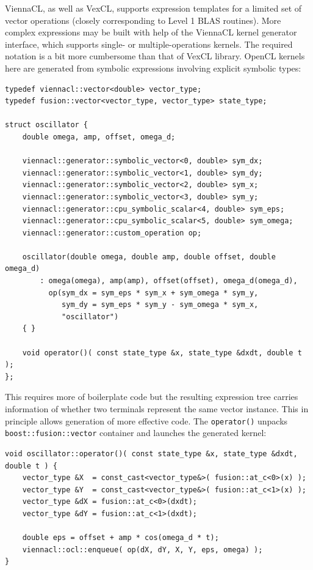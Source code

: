 \documentclass[1p]{elsarticle}
\newcommand{\code}[1]{\lstinline|#1|}
\begin{document}
ViennaCL, as well as VexCL, supports expression templates for a limited set of
vector operations (closely corresponding to Level 1 BLAS routines). More
complex expressions may be built with help of the ViennaCL kernel generator
interface, which supports single- or multiple-operations kernels. The required
notation is a bit more cumbersome than that of VexCL library. OpenCL kernels
here are generated from symbolic expressions involving explicit symbolic types:
\begin{lstlisting}
typedef viennacl::vector<double> vector_type;
typedef fusion::vector<vector_type, vector_type> state_type;

struct oscillator {
    double omega, amp, offset, omega_d;

    viennacl::generator::symbolic_vector<0, double> sym_dx;
    viennacl::generator::symbolic_vector<1, double> sym_dy;
    viennacl::generator::symbolic_vector<2, double> sym_x;
    viennacl::generator::symbolic_vector<3, double> sym_y;
    viennacl::generator::cpu_symbolic_scalar<4, double> sym_eps;
    viennacl::generator::cpu_symbolic_scalar<5, double> sym_omega;
    viennacl::generator::custom_operation op;

    oscillator(double omega, double amp, double offset, double omega_d)
        : omega(omega), amp(amp), offset(offset), omega_d(omega_d),
          op(sym_dx = sym_eps * sym_x + sym_omega * sym_y,
             sym_dy = sym_eps * sym_y - sym_omega * sym_x,
             "oscillator")
    { }

    void operator()( const state_type &x, state_type &dxdt, double t );
};
\end{lstlisting}

This requires more of boilerplate code but the resulting expression tree
carries information of whether two terminals represent the same vector
instance. This in principle allows generation of more effective code. The
\code{operator()} unpacks \code{boost::fusion::vector} container and launches
the generated kernel:
\begin{lstlisting}[firstnumber=24]
void oscillator::operator()( const state_type &x, state_type &dxdt, double t ) {
    vector_type &X  = const_cast<vector_type&>( fusion::at_c<0>(x) );
    vector_type &Y  = const_cast<vector_type&>( fusion::at_c<1>(x) );
    vector_type &dX = fusion::at_c<0>(dxdt);
    vector_type &dY = fusion::at_c<1>(dxdt);

    double eps = offset + amp * cos(omega_d * t);
    viennacl::ocl::enqueue( op(dX, dY, X, Y, eps, omega) );
}
\end{lstlisting}
\end{document}

